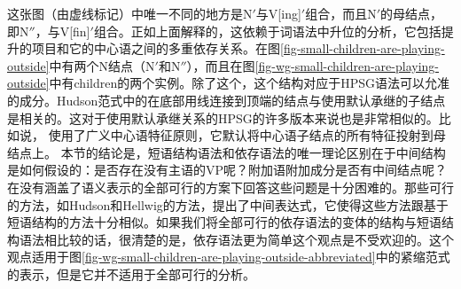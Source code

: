 这张图（由虚线标记）中唯一不同的地方是N$'$与V{[ing]}$'$组合，而且N$'$的母结点，即N$''$，与V{[fin]}$'$组合。正如上面解释的，这依赖于词语法中升位的分析，它包括提升的项目和它的中心语之间的多重依存关系。在图\ref{fig-small-children-are-playing-outside}中有两个N结点（N$'$和N$''$），而且在图\ref{fig-wg-small-children-are-playing-outside}中有children的两个实例。除了这个，这个结构对应于HPSG语法可以允准的成分。Hudson范式中的在底部用线连接到顶端的结点与使用默认承继的子结点是相关的。这对于使用默认承继关系的HPSG的许多版本来说也是非常相似的。比如说， \citet[]{GSag2000a-u}使用了广义中心语特征原则，它默认将中心语子结点的所有特征投射到母结点上。
%
本节的结论是，短语结构语法和依存语法的唯一理论区别在于中间结构是如何假设的：是否存在没有主语的VP呢？附加语附加成分是否有中间结点呢？在没有涵盖了语义表示的全部可行的方案下回答这些问题是十分困难的。那些可行的方法，如Hudson和Hellwig的方法，提出了中间表达式，它使得这些方法跟基于短语结构的方法十分相似。如果我们将全部可行的依存语法的变体的结构与短语结构语法相比较的话，很清楚的是，依存语法更为简单这个观点是不受欢迎的。这个观点适用于图\ref{fig-wg-small-children-are-playing-outside-abbreviated}中的紧缩范式的表示，但是它并不适用于全部可行的分析。
